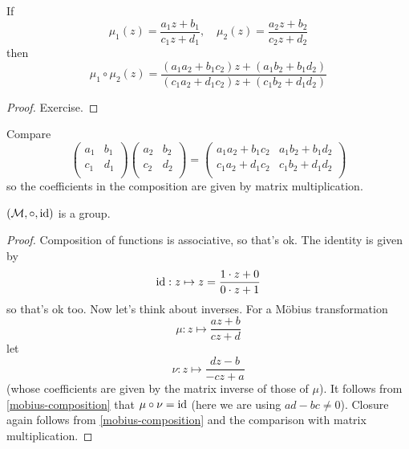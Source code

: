 \documentclass{../template/note}
\begin{document}
    \begin{proposition}
        If
        \[
            \mu_1(z) = \frac{a_1 z + b_1}{c_1 z + d_1}, \quad \mu_2(z) = \frac{a_2 z + b_2}{c_2 z + d_2}
        \]
        then
        \[
            \mu_1 \circ \mu_2 (z) = \frac{(a_1a_2 + b_1c_2)z + (a_1b_2 + b_1d_2)}{(c_1a_2 + d_1c_2)z + (c_1b_2 + d_1d_2)}
        \]
        \label{mobius-composition}
    \end{proposition}

    \begin{proof}
        Exercise.
    \end{proof}    
    
    \begin{remark*}
        Compare
        \[
            \begin{pmatrix}
             a_1 & b_1 \\
             c_1 & d_1 \\
            \end{pmatrix}\begin{pmatrix}
             a_2 & b_2 \\
             c_2 & d_2 \\
            \end{pmatrix} = \begin{pmatrix}
             a_1a_2 + b_1c_2 & a_1b_2 + b_1d_2 \\
             c_1a_2 + d_1c_2 & c_1b_2 + d_1d_2 \\
            \end{pmatrix}
        \]
        so the coefficients in the composition are given by matrix multiplication.
    \end{remark*}

    \begin{theorem}
        \((\mathcal M, \circ, \operatorname{id})\) is a group.
    \end{theorem}
    
    \begin{proof}
        Composition of functions is associative, so that's ok. The identity is given by
        \[
            \operatorname{id}: z \mapsto z = \frac{1 \cdot z + 0}{0 \cdot z + 1}
        \]
        so that's ok too. Now let's think about inverses. For a M\"obius transformation
        \[
            \mu: z \mapsto \frac{az+b}{cz+d}
        \]
        let
        \[
            \nu: z \mapsto \frac{dz-b}{-cz+a}
        \]
        (whose coefficients are given by the matrix inverse of those of \(\mu\)). It follows from \cref{mobius-composition} that \(\mu \circ \nu = \operatorname{id}\) (here we are using \(ad - bc \neq 0\)). Closure again follows from \cref{mobius-composition} and the comparison with matrix multiplication.
    \end{proof}
    
\end{document}
